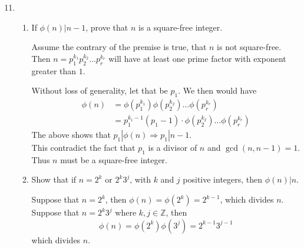 \documentclass[12pt]{exam}
\theoremstyle{definition}
\begin{document}
\begin{enumerate}
          \setcounter{enumi}{10}
    \item \begin{enumerate}
              \item If $\phi(n) | n - 1$, prove that $n$ is a square-free integer.\newline
                    [Hint: Assume that $n$ has the prime factorization $n = p_1^{k_1}p_2^{k_2} \dots p_r^{k_r}$,
                    where $k_1 \geq 2$.
                    Then $p_1 | \phi(n)$, whence $p_1 | n - 1$, which leads to a contradiction.]
                    \begin{answer}
                        Assume the contrary of the premise is true, that $n$ is not square-free.
                        Then $n = p^{k_1}_1 p^{k_2}_2 \dots p^{k_r}_r$ will have at least one prime factor with exponent greater than $1$.

                        Without loss of generality, let that be $p_1$. We then would have
                        \[
                            \begin{aligned}
                                \phi(n) & = \phi(p^{k_1}_1) \phi(p^{k_2}_2) \dots \phi(p^{k_r}_r)             \\
                                        & = p^{k_1-1}_1 (p_1 - 1) \cdot \phi(p^{k_2}_2) \dots \phi(p^{k_r}_r)
                            \end{aligned}
                        \]
                        The above shows that $p_1 | \phi(n) \Rightarrow p_1 | n-1$.\\
                        This contradict the fact that $p_1$ is a divisor of $n$ and $\gcd(n, n-1) = 1$.\\
                        Thus $n$ must be  a square-free integer.
                    \end{answer}

              \item Show that if $n = 2^k$ or $2^k 3^j$, with $k$ and $j$ positive integers, then $\phi(n) | n$.
                    \begin{answer}
                        Suppose that $n = 2^k$, then $\phi(n) = \phi(2^k) = 2^{k-1}$, which divides $n$.\\
                        Suppose that $n = 2^k3^j$ where $k, j \in \mathbb{Z}$, then
                        \[
                            \phi(n) = \phi(2^k)\phi(3^j) = 2^{k-1} 3^{j-1}
                        \]
                        which divides $n$.
                    \end{answer}


\end{enumerate}
\end{enumerate}
\end{document}
